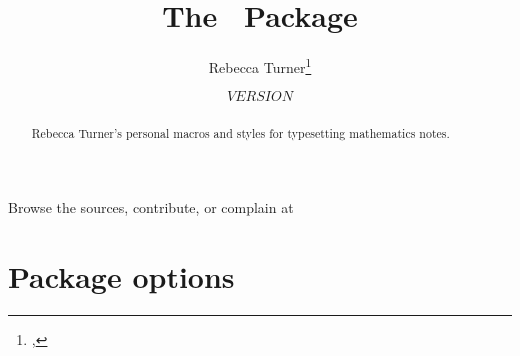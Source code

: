 \documentclass{ltxguidex}
\author{Rebecca Turner\thanks{\email{rbt@sent.as}, \https{becca.ooo}}}
\title{The \mn\ Package}
\date{${VERSION}$}
\begin{document}
\maketitle

\begin{abstract}
	Rebecca Turner's personal macros and styles for typesetting mathematics
	notes.
\end{abstract}

\begin{note}
	Browse the sources, contribute, or complain at \\
\end{note}

\tableofcontents
\vfill
\pagebreak

\section{Package options}
\end{document}
